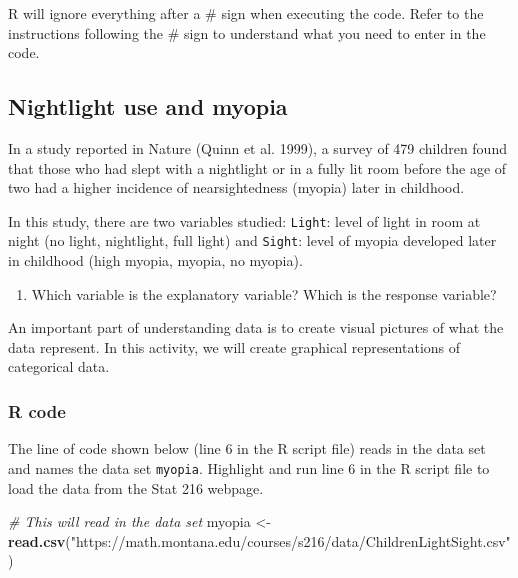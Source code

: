 \documentclass[
]{report}
\newenvironment{Shaded}{\begin{snugshade}}{\end{snugshade}}
\newcommand{\CommentTok}[1]{\textcolor[rgb]{0.56,0.35,0.01}{\textit{#1}}}
\newcommand{\FunctionTok}[1]{\textcolor[rgb]{0.13,0.29,0.53}{\textbf{#1}}}
\newcommand{\NormalTok}[1]{#1}
\newcommand{\OtherTok}[1]{\textcolor[rgb]{0.56,0.35,0.01}{#1}}
\newcommand{\StringTok}[1]{\textcolor[rgb]{0.31,0.60,0.02}{#1}}
\providecommand{\tightlist}{%
  \setlength{\itemsep}{0pt}\setlength{\parskip}{0pt}}
\begin{document}
R will ignore everything after a \# sign when executing the code. Refer to the instructions following the \# sign to understand what you need to enter in the code.

\subsection*{Nightlight use and myopia}\label{nightlight-use-and-myopia}

In a study reported in Nature (Quinn et al. 1999), a survey of 479 children found that those who had slept with a nightlight or in a fully lit room before the age of two had a higher incidence of nearsightedness (myopia) later in childhood.

In this study, there are two variables studied: \texttt{Light}: level of light in room at night (no light, nightlight, full light) and \texttt{Sight}: level of myopia developed later in childhood (high myopia, myopia, no myopia).

\begin{enumerate}
\def\labelenumi{\arabic{enumi}.}
\tightlist
\item
  Which variable is the explanatory variable? Which is the response variable?
\end{enumerate}

\vspace{0.8in}

An important part of understanding data is to create visual pictures of what the data represent. In this activity, we will create graphical representations of categorical data.

\subsubsection*{R code}\label{r-code-1}

The line of code shown below (line 6 in the R script file) reads in the data set and names the data set \texttt{myopia}. Highlight and run line 6 in the R script file to load the data from the Stat 216 webpage.

\begin{Shaded}
\begin{Highlighting}[]
\CommentTok{\# This will read in the data set}
\NormalTok{myopia }\OtherTok{\textless{}{-}} \FunctionTok{read.csv}\NormalTok{(}\StringTok{"https://math.montana.edu/courses/s216/data/ChildrenLightSight.csv"}\NormalTok{) }
\end{Highlighting}
\end{Shaded}
\end{document}
